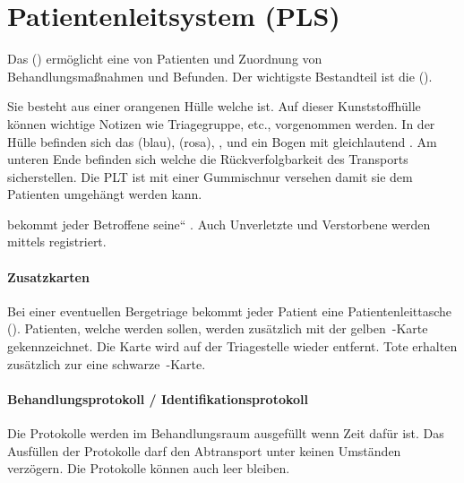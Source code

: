 \section{Patientenleitsystem (PLS)}

Das  ()
ermöglicht eine  von Patienten und Zuordnung
von Behandlungsmaßnahmen und Befunden. Der wichtigste Bestandteil
ist die 
(). 

Sie besteht aus einer orangenen Hülle welche 
ist. Auf dieser Kunststoffhülle können wichtige Notizen wie
Triagegruppe, etc., vorgenommen werden. In der Hülle befinden sich
das  (blau),  (rosa),
,  und ein Bogen mit gleichlautend
. Am unteren Ende befinden sich  welche die Rückverfolgbarkeit des Transports
sicherstellen. Die PLT ist mit einer Gummischnur versehen damit sie dem
Patienten umgehängt werden kann. 

 bekommt jeder Betroffene {\quotedblbase}seine{\textquotedblleft} . Auch Unverletzte
und Verstorbene werden mittels  registriert.

\paragraph{Zusatzkarten}

Bei einer eventuellen Bergetriage bekommt jeder Patient eine
Patientenleittasche (). Patienten, welche 
werden sollen, werden zusätzlich mit der gelben
{}\,-Karte
gekennzeichnet. Die Karte wird auf der Triagestelle wieder entfernt. Tote
erhalten zusätzlich zur  eine schwarze
{}\,-Karte.

\paragraph{Behandlungsprotokoll / Identifikationsprotokoll}

Die Protokolle werden im Behandlungsraum ausgefüllt wenn Zeit dafür
ist. Das Ausfüllen der Protokolle darf den Abtransport unter keinen
Umständen verzögern. Die Protokolle können auch leer bleiben.

